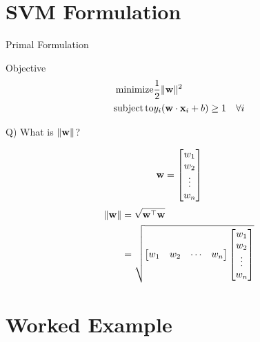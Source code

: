 \documentclass{beamer}
\begin{document}
\section{SVM Formulation}

{
	
}

\begin{frame}{Primal Formulation}
	\begin{tcolorbox}{Objective}
	\begin{align*}
	\operatorname{minimize} & \frac{1}{2}\|\mathbf{w}\|^{2} \\
	\operatorname{subject\,to} & y_{i}(\mathbf{w} \cdot \mathbf{x}_{i} + b) \geq 1 \quad \forall i
	\end{align*}
\end{tcolorbox}
\pause 
Q) What is $\|\mathbf{w}\|$?
\pause
\begin{multicols}{2}
\begin{equation*}
	 \mathbf{w} = \begin{bmatrix}
	 w_{1} \\
     w_{2} \\
     \vdots  \\
     w_{n} \\
	\end{bmatrix}
\end{equation*}\break
\begin{align*}
	 \|\mathbf{w}\| &= \sqrt{\mathbf{w}^\top\mathbf{w}}\\
	 &= \sqrt{\begin{bmatrix}
	 w_{1} & w_{2} & \cdots & w_{n}
	 \end{bmatrix}
	 \begin{bmatrix}
	  w_{1} \\
	  w_{2} \\
     \vdots  \\
     w_{n} \\
	 \end{bmatrix}}
\end{align*}

\end{multicols}

\end{frame}

\section{Worked Example}

{
	
}
\end{document}
